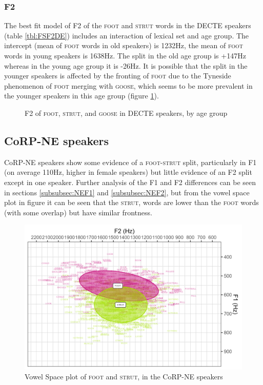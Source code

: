 \documentclass[12pt,a4paper,notitlepage,
bibliography=totoc,
numbers=endperiod,
appendixprefix=true,
usenames,dvipsnames]{scrartcl}
\let\Oldsubsection\subsection
\renewcommand{\subsection}{\FloatBarrier\Oldsubsection}
\let\Oldsubsubsection\subsubsection
\renewcommand{\subsubsection}{\FloatBarrier\Oldsubsubsection}
\newcommand{\scs}{\textsc}
\newcommand{\foot}{\scs{foot}}
\newcommand{\strutt}{\scs{strut}}
\newcommand{\goose}{\scs{goose}}
\newcommand{\FS}{\scs{foot}-\scs{strut}}
\begin{document}
\subsubsection{F2}
The best fit model of F2 of the \foot{} and \strutt{} words in the DECTE speakers (table \ref{tbl:FSF2DE}) includes an interaction of lexical set and age group. The intercept (mean of \foot{} words in old speakers) is 1232Hz, the mean of \foot{} words in young speakers is 1638Hz. The split in the old age group is +147Hz whereas in the young age group it is -26Hz. It is possible that the split in the younger speakers is affected by the  fronting of \foot{} due to the Tyneside phenomenon of \foot{} merging with \goose{}, which seems to be more prevalent in the younger speakers in this age group (figure \ref{fig:FSGF2DE-age}).




\begin{figure}
	\centering
	
	\caption{F2 of \foot{}, \strutt{}, and \goose{} in DECTE speakers, by age group} \label{fig:FSGF2DE-age}
\end{figure}


\subsection{CoRP-NE speakers}
CoRP-NE speakers show some evidence of a \FS{} split, particularly in F1 (on average 110Hz, higher in female speakers) but little evidence of an F2 split except in one speaker. Further analysis of the F1 and F2 differences can be seen in sections \ref{subsubsec:NEF1} and \ref{subsubsec:NEF2}, but from the vowel space plot in figure it can be seen that the \strutt{}, words are lower than the \foot{} words (with some overlap) but have similar frontness.

\begin{figure}[h]
	\includegraphics[width=\textwidth]{../figures/FS-NE-vplot.png}
	\caption{Vowel Space plot of \foot{} and \strutt{}, in the CoRP-NE speakers} \label{fig:FSvplotNE}
\end{figure}
\end{document}
